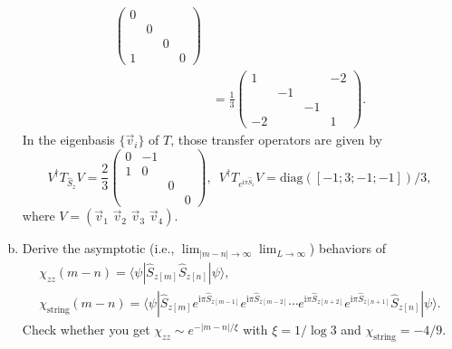 \documentclass[11pt,a4paper,oneside]{article}
\begin{document}
\begin{enumerate}[(a)]
\begin{equation}
\begin{aligned}
\begin{pmatrix}
0 & & & \\
& 0 & & \\
& & 0 & \\
1 & & & 0
\end{pmatrix}
\\
&=
\frac{1}{3}
\begin{pmatrix}
1 & & & -2 \\
& -1 & & \\
& & -1 & \\
-2 & & & 1
\end{pmatrix} .
\end{aligned}
\end{equation}
In the eigenbasis $\{\vec{v}_i \}$ of $T$, those transfer operators are given by
\begin{equation}
V^\dagger T_{\hat{S}_z} V = 
\frac{2}{3}
\begin{pmatrix}
0 & -1 & & \\
1 & 0 & & \\
& & 0 & \\
& & & 0
\end{pmatrix},
\,\,\,
V^\dagger T_{e^{\mathrm{i} \pi \hat{S}_z}} V= 
\mathrm{diag}([-1; 3; -1; -1])/3 ,
\end{equation}
where $V = (\vec{v}_1 \,\, \vec{v}_2 \,\, \vec{v}_3 \,\, \vec{v}_4)$.

\item 
Derive the asymptotic (i.e., $\lim_{|m - n| \to \infty} \lim_{L \to \infty}$) behaviors of
\begin{equation}
\begin{gathered}
\chi_{zz} (m - n) = \langle \psi | \hat{S}_{z [m]} \hat{S}_{z [n]} | \psi \rangle,
\\
\chi_\mathrm{string} (m - n) = \langle \psi | \hat{S}_{z [m]}
e^{\mathrm{i} \pi \hat{S}_{z[m-1]}}
e^{\mathrm{i} \pi \hat{S}_{z[m-2]}}
\cdots
e^{\mathrm{i} \pi \hat{S}_{z[n+2]}}
e^{\mathrm{i} \pi \hat{S}_{z[n+1]}}
\hat{S}_{z [n]} | \psi \rangle .
\end{gathered}
\end{equation}
Check whether you get $\chi_{zz} \sim e^{- |m - n| / \xi}$ with $\xi = 1/\log 3$ and $\chi_\mathrm{string} = -4/9$.


\end{enumerate}
\end{document}
